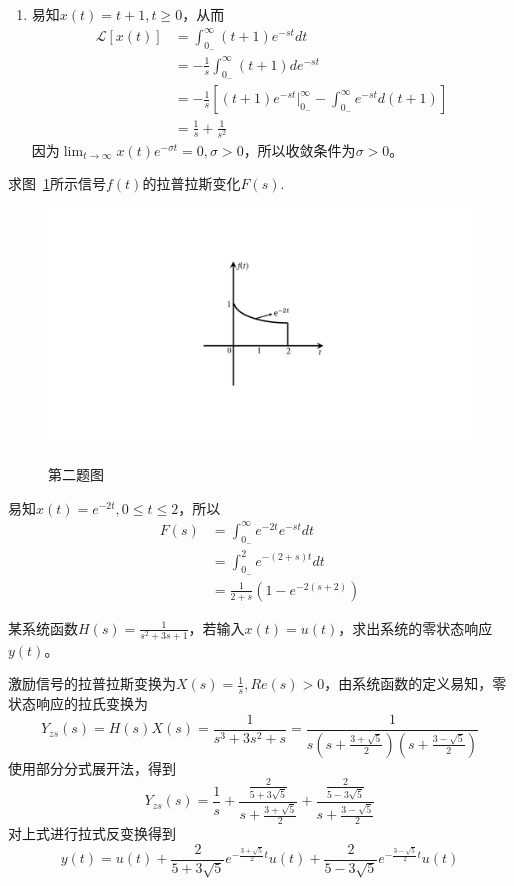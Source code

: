 \documentclass[answers]{exam}  %
\begin{document}
\begin{questions}
\begin{solution}
\begin{enumerate}[(1)]
    \item 易知$x(t)=t+1,t\geq0$，从而\begin{align*}
    	\mathcal{L}[x(t)]&=\int_{0_-}^{\infty}(t+1)e^{-st}dt\\
    	&=-\frac{1}{s}\int_{0_-}^{\infty}(t+1)de^{-st}\\
    	&=-\frac{1}{s}[(t+1)e^{-st}\big|_{0_-}^{\infty}-\int_{0_-}^{\infty}e^{-st}d(t+1)]\\
    	&=\frac{1}{s}+\frac{1}{s^2}
    \end{align*}
    因为$\lim_{t\rightarrow\infty}x(t)e^{-\sigma t}=0,\sigma>0$，所以收敛条件为$\sigma>0$。
\end{enumerate}
\end{solution}

\question 求图~\ref{Figure:question_2}所示信号$f(t)$的拉普拉斯变化$F(s)$.
\begin{figure}[!h]
	\centering
	\includegraphics[width=0.3\linewidth]{pics/question_2.pdf}
	\label{Figure:question_2}
	\caption{第二题图}
\end{figure}
\begin{solution}
	易知$x(t)=e^{-2t},0\leq t\leq 2$，所以\begin{align*}
		F(s)&=\int_{0_-}^{\infty}e^{-2t}e^{-st}dt\\
		&=\int_{0_-}^{2}e^{-(2+s)t}dt\\
		&=\frac{1}{2+s}(1-e^{-2(s+2)})
	\end{align*}
\end{solution}

\question 某系统函数$H(s)=\frac{1}{s^2+3s+1}$，若输入$x(t)=u(t)$，求出系统的零状态响应$y(t)$。
\begin{solution}
激励信号的拉普拉斯变换为$X(s)=\frac{1}{s},Re(s)>0$，由系统函数的定义易知，零状态响应的拉氏变换为$$Y_{zs}(s)=H(s)X(s)=\frac{1}{s^3+3s^2+s}=\frac{1}{s(s+\frac{3+\sqrt{5}}{2})(s+\frac{3-\sqrt{5}}{2})}$$使用部分分式展开法，得到$$Y_{zs}(s)=\frac{1}{s}+\frac{\frac{2}{5+3\sqrt{5}}}{s+\frac{3+\sqrt{5}}{2}}+\frac{\frac{2}{5-3\sqrt{5}}}{s+\frac{3-\sqrt{5}}{2}}$$
对上式进行拉式反变换得到$$y(t)=u(t)+\frac{2}{5+3\sqrt{5}}e^{-\frac{3+\sqrt{5}}{2}t}u(t)+\frac{2}{5-3\sqrt{5}}e^{-\frac{3-\sqrt{5}}{2}t}u(t)$$
\end{solution}


\end{questions}
\end{document}
